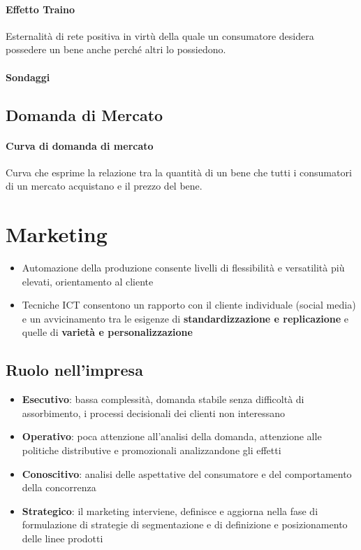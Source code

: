 \documentclass[12pt]{article}
\begin{document}
\paragraph{Effetto Traino} Esternalità di rete positiva in virtù della quale un consumatore desidera possedere un bene anche perché altri lo possiedono.
\paragraph{Sondaggi}
\subsection{Domanda di Mercato}
\paragraph{Curva di domanda di mercato} Curva che esprime la relazione tra la quantità di un bene che tutti i consumatori di un mercato acquistano e il prezzo del bene.
\newpage
\section{Marketing}
\begin{itemize}
    \item Automazione della produzione consente livelli di flessibilità e versatilità più elevati, orientamento al cliente
    \item Tecniche ICT consentono un rapporto con il cliente individuale (social media) e un avvicinamento tra le esigenze di \textbf{standardizzazione e replicazione} e quelle di \textbf{varietà e personalizzazione}
\end{itemize}
\subsection{Ruolo nell'impresa}
\begin{itemize}
    \item \textbf{Esecutivo}: bassa complessità, domanda stabile senza difficoltà di
          assorbimento, i processi decisionali dei clienti non interessano
    \item \textbf{Operativo}: poca attenzione all’analisi della domanda, attenzione alle politiche distributive e promozionali analizzandone gli effetti
    \item \textbf{Conoscitivo}: analisi delle aspettative del consumatore e del comportamento della concorrenza
    \item \textbf{Strategico}: il marketing interviene, definisce e aggiorna nella fase di formulazione di strategie di segmentazione e di definizione e posizionamento delle linee prodotti
\end{itemize}
\end{document}
